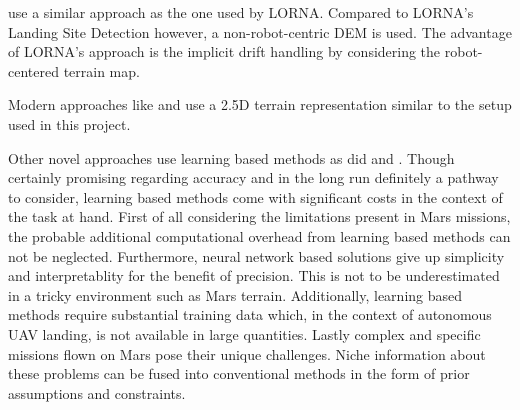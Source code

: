 \citep{Johnson2005VisionGuided} use a similar approach as the one used by LORNA. Compared to LORNA's Landing Site Detection \citep{LSD1,LSD2} however, a non-robot-centric DEM is used. The advantage of LORNA's approach is the implicit drift handling by considering the robot-centered terrain map.

Modern approaches like \citep{Fankhauser2014RobotCentric, Forster2015Continuous} and \citep{Daftry2018Robust} use a 2.5D terrain representation similar to the setup used in this project.

Other novel approaches use learning based methods as did \citep{Neves2024Multimodal, Abdollahzadeh2022SafeLandingZones} and \citep{TovanchePicon2024RealTimeSafeValidation}. Though certainly promising regarding accuracy and in the long run definitely a pathway to consider, learning based methods come with significant costs in the context of the task at hand. First of all considering the limitations present in Mars missions, the probable additional computational overhead from learning based methods can not be neglected. Furthermore, neural network based solutions give up simplicity and interpretablity for the benefit of precision. This is not to be underestimated in a tricky environment such as Mars terrain. Additionally, learning based methods require substantial training data which, in the context of autonomous UAV landing, is not available in large quantities. Lastly complex and specific missions flown on Mars pose their unique challenges. Niche information about these problems can be fused into conventional methods in the form of prior assumptions and constraints.

% 